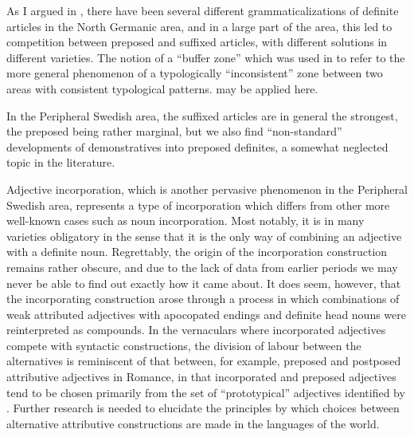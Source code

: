 
As I argued in \citet{Dahl2003}, there have been several different grammaticalizations of definite articles in the North Germanic area, and in a large part of the area, this led to competition between preposed and suffixed articles, with different solutions in different varieties. The notion of a “buffer zone” which was used in \citet{Stilo2004} to refer to the more general phenomenon of a typologically “inconsistent” zone between two areas with consistent typological patterns.  may be applied here.


In the Peripheral Swedish area, the suffixed articles are in general the strongest, the preposed being rather marginal, but we also find “non-standard” developments of demonstratives into preposed definites, a somewhat neglected topic in the literature. 


Adjective incorporation, which is another pervasive phenomenon in the Peripheral Swedish area, represents a type of incorporation which differs from other more well-known cases such as noun incorporation. Most notably, it is in many varieties obligatory in the sense that it is the only way of combining an adjective with a definite noun. Regrettably, the origin of the incorporation construction remains rather obscure, and due to the lack of data from earlier periods we may never be able to find out exactly how it came about. It does seem, however, that the incorporating construction arose through a process in which combinations of weak attributed adjectives with apocopated endings and definite head nouns were reinterpreted as compounds. In the vernaculars where incorporated adjectives compete with syntactic constructions, the division of labour between the alternatives is reminiscent of that between, for example, preposed and postposed attributive adjectives in Romance, in that incorporated and preposed adjectives tend to be chosen primarily from the set of “prototypical” adjectives identified by \citet{Dixon1977}. Further research is needed to elucidate the principles by which choices between alternative attributive constructions are made in the languages of the world.


